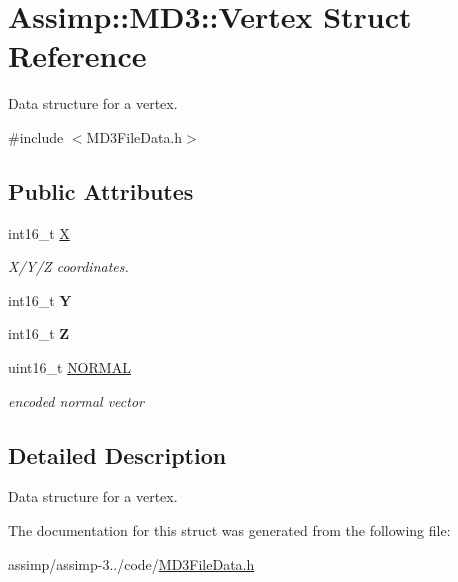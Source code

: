 \hypertarget{struct_assimp_1_1_m_d3_1_1_vertex}{\section{Assimp\+:\+:M\+D3\+:\+:Vertex Struct Reference}
\label{struct_assimp_1_1_m_d3_1_1_vertex}
}


Data structure for a vertex.  




{\ttfamily \#include $<$M\+D3\+File\+Data.\+h$>$}

\subsection*{Public Attributes}
\begin{DoxyCompactItemize}
\item 
\hypertarget{struct_assimp_1_1_m_d3_1_1_vertex_a243233c6c957e7c15c67c55e2abdd914}{int16\+\_\+t \hyperlink{struct_assimp_1_1_m_d3_1_1_vertex_a243233c6c957e7c15c67c55e2abdd914}{X}}\label{struct_assimp_1_1_m_d3_1_1_vertex_a243233c6c957e7c15c67c55e2abdd914}

\begin{DoxyCompactList}\small\item\em X/\+Y/\+Z coordinates. \end{DoxyCompactList}\item 
\hypertarget{struct_assimp_1_1_m_d3_1_1_vertex_a3d354eecac17cf95eb2c77fe8da0dd65}{int16\+\_\+t {\bfseries Y}}\label{struct_assimp_1_1_m_d3_1_1_vertex_a3d354eecac17cf95eb2c77fe8da0dd65}

\item 
\hypertarget{struct_assimp_1_1_m_d3_1_1_vertex_a8d07c3a6773133578155219747b9c5ce}{int16\+\_\+t {\bfseries Z}}\label{struct_assimp_1_1_m_d3_1_1_vertex_a8d07c3a6773133578155219747b9c5ce}

\item 
\hypertarget{struct_assimp_1_1_m_d3_1_1_vertex_a16aa1ca93af49a0eb20458e6dbd5114f}{uint16\+\_\+t \hyperlink{struct_assimp_1_1_m_d3_1_1_vertex_a16aa1ca93af49a0eb20458e6dbd5114f}{N\+O\+R\+M\+A\+L}}\label{struct_assimp_1_1_m_d3_1_1_vertex_a16aa1ca93af49a0eb20458e6dbd5114f}

\begin{DoxyCompactList}\small\item\em encoded normal vector \end{DoxyCompactList}\end{DoxyCompactItemize}


\subsection{Detailed Description}
Data structure for a vertex. 

The documentation for this struct was generated from the following file\+:\begin{DoxyCompactItemize}
\item 
assimp/assimp-\/3../code/\hyperlink{_m_d3_file_data_8h}{M\+D3\+File\+Data.\+h}\end{DoxyCompactItemize}
